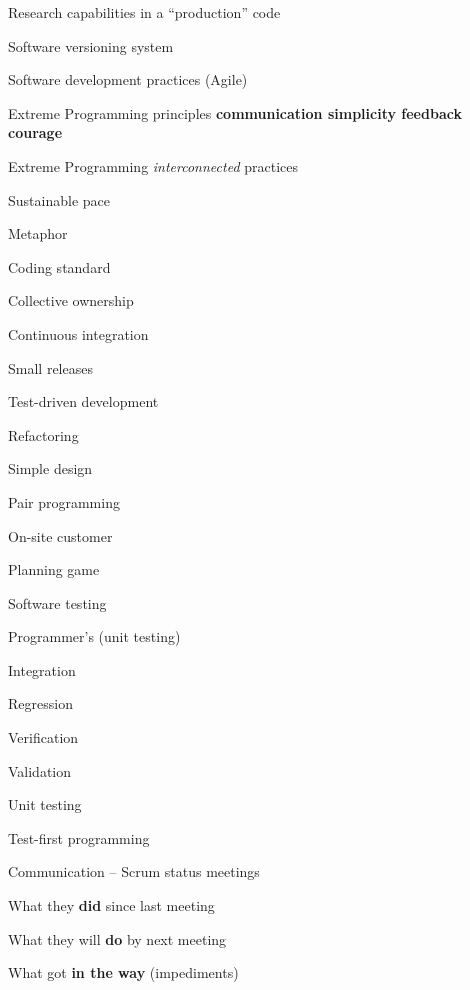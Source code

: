 \documentclass[twocolumn]{article}
\newenvironment{itemiz}%
  {\begin{list}{}{\raggedright
      \setlength{\itemsep}{2pt}%
      \setlength{\parskip}{4pt}\setlength{\parsep}{2pt}}}%
  {\end{list}}%
\begin{document}
  \begin{itemize}
  \item Research capabilities in a ``production'' code
  \item Software versioning system
  \item Software development practices (Agile)
  \item Extreme Programming principles \textbf{communication simplicity feedback courage}
  \item Extreme Programming \emph{interconnected} practices
    \begin{itemiz}
    \item Sustainable pace
    \item Metaphor
    \item Coding standard
    \item Collective ownership
    \item Continuous integration
    \item Small releases
    \item Test-driven development
    \item Refactoring
    \item Simple design
    \item Pair programming
    \item On-site customer
    \item Planning game
    \end{itemiz}
  \item Software testing
    \begin{itemiz}
    \item Programmer's (unit testing)
    \item Integration
    \item Regression
    \item Verification
    \item Validation
    \end{itemiz}
  \item Unit testing
  \item Test-first programming
  \item Communication -- Scrum status meetings
    \begin{itemiz}
    \item What they {\bf did} since last meeting
    \item What they will {\bf do} by next meeting
    \item What got {\bf in the way} (impediments)
    \end{itemiz}
  \end{itemize}
 
\end{document}
